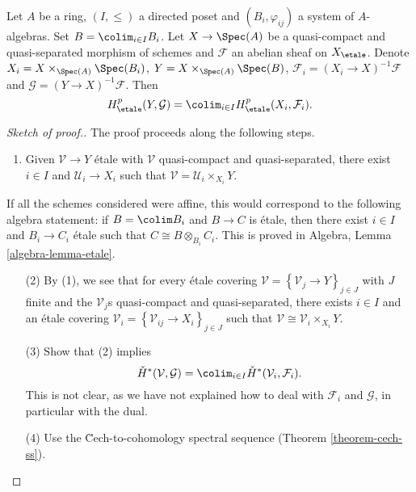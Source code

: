 \begin{theorem}
\label{theorem-directed-colimit-cohomology}
Let $A$ be a ring, $(I, \leq)$ a directed poset and $(B_i, \varphi_{ij})$ a
system of $A$-algebras. Set $B=\colim_{i\in I} B_i$. Let $X \to \Spec(A)$
be a quasi-compact and quasi-separated morphism of schemes and
$\mathcal{F}$ an abelian sheaf on $X_\etale$. Denote
$X_i = X \times_{\Spec(A)} \Spec(B_i)$,
$Y = X \times_{\Spec(A)} \Spec(B)$,
$\mathcal{F}_i = (X_i\to X)^{-1}\mathcal{F}$ and
$\mathcal{G} = (Y \to X)^{-1}\mathcal{F}$. Then
$$
H_\etale^p(Y, \mathcal{G}) =
\colim_{i\in I} H_\etale^p (X_i, \mathcal{F}_i).
$$
\end{theorem}

\begin{proof}[Sketch of proof.]
The proof proceeds along the following steps.
\begin{enumerate}
\item Given $\mathcal{V}\to Y$ \'etale with $\mathcal{V}$ quasi-compact and
quasi-separated, there exist $i\in I$ and $\mathcal{U}_i \to X_i$ such that
$\mathcal{V} = \mathcal{U}_i \times_{X_i} Y$.
\end{enumerate}
If all the schemes considered were affine, this would correspond to the
following algebra statement: if $B=\colim B_i$ and $B\to C$ is \'etale,
then there exist $i\in I$ and $B_i\to C_i$ \'etale such that $C \cong B
\otimes_{B_i} C_i$. This is proved in Algebra, Lemma \ref{algebra-lemma-etale}.
\begin{enumerate}
\item[(2)]
By (1), we see that for every \'etale covering $\mathcal{V} =
\left\{\mathcal{V}_j\to Y\right\}_{j\in J}$ with $J$ finite and the
$\mathcal{V}_j$s quasi-compact and quasi-separated, there exists $i\in I$ and
an \'etale covering $\mathcal{V}_i = \left\{\mathcal{V}_{ij} \to X_i
\right\}_{j\in J}$ such that $\mathcal{V} \cong \mathcal{V}_i \times_{X_i} Y$.
\item[(3)]
Show that (2) implies
$$
\check H^*(\mathcal{V}, \mathcal{G})=\colim_{i\in I}\check
H^*(\mathcal{V}_i, \mathcal{F}_i).
$$
This is not clear, as we have not explained how to deal with $\mathcal{F}_i$
and $\mathcal{G}$, in particular with the dual.
\item[(4)] Use the \u Cech-to-cohomology spectral sequence
(Theorem \ref{theorem-cech-ss}).
\end{enumerate}
\end{proof}





